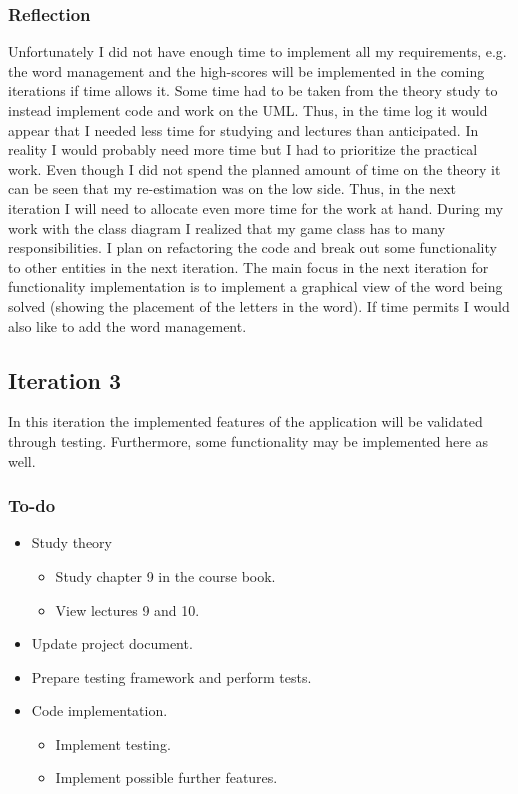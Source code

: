 \documentclass[12pt, letterpaper]{article}
\begin{document}
\subsubsection{Reflection}
Unfortunately I did not have enough time to implement all my requirements, e.g. the word management and the high-scores will be implemented in the coming iterations if time allows it. Some time had to be taken from the theory study to instead implement code and work on the UML. Thus, in the time log it would appear that I needed less time for studying and lectures than anticipated. In reality I would probably need more time but I had to prioritize the practical work. Even though I did not spend the planned amount of time on the theory it can be seen that my re-estimation was on the low side. Thus, in the next iteration I will need to allocate even more time for the work at hand.
\newline
\newline
During my work with the class diagram I realized that my game class has to many responsibilities. I plan on refactoring the code and break out some functionality to other entities in the next iteration. The main focus in the next iteration for functionality implementation is to implement a graphical view of the word being solved (showing the placement of the letters in the word). If time permits I would also like to add the word management.
\subsection{Iteration 3}
In this iteration the implemented features of the application will be validated through testing. Furthermore, some functionality may be implemented here as well.
\subsubsection{To-do}
\begin{itemize}
	\item Study theory
	\begin{itemize}
		\item Study chapter 9 in the course book.
		\item View lectures 9 and 10.
	\end{itemize}
	\item Update project document.
	\item Prepare testing framework and perform tests.
	\item Code implementation.
	\begin{itemize}
		\item Implement testing.
		\item Implement possible further features.
	\end{itemize}
\end{itemize}
\end{document}
